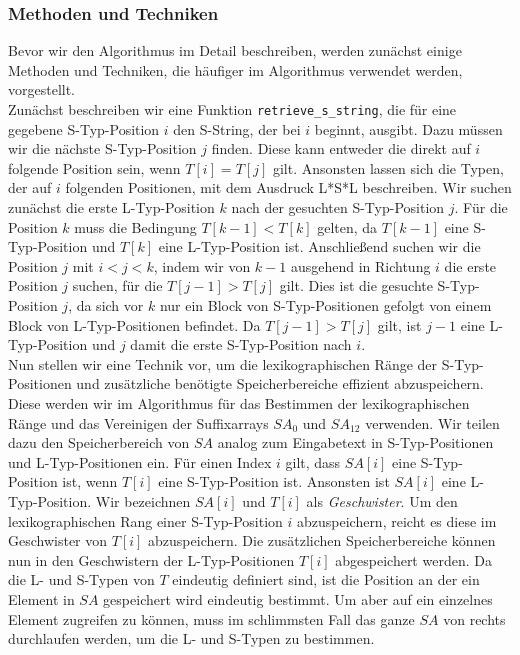 \subsubsection{Methoden und Techniken}
\label{nzSufSort:intro:methods}

Bevor wir den Algorithmus im Detail beschreiben, werden zunächst einige Methoden und Techniken, die häufiger im Algorithmus verwendet werden, vorgestellt. \\
Zunächst beschreiben wir eine Funktion \texttt{retrieve\_s\_string}, die für eine gegebene S-Typ-Position $i$ den S-String, der bei $i$ beginnt, ausgibt. Dazu müssen wir die nächste S-Typ-Position $j$ finden. Diese kann entweder die direkt auf $i$ folgende Position sein, wenn $T[i]=T[j]$ gilt. Ansonsten lassen sich die Typen, der auf $i$ folgenden Positionen, mit dem Ausdruck L*S*L beschreiben. Wir suchen zunächst die erste L-Typ-Position $k$ nach der gesuchten S-Typ-Position $j$. Für die Position $k$ muss die Bedingung $T[k-1] < T[k]$ gelten, da $T[k-1]$ eine S-Typ-Position und $T[k]$ eine L-Typ-Position ist. Anschließend suchen wir die Position $j$ mit $i < j < k$, indem wir von $k-1$ ausgehend in Richtung $i$ die erste Position $j$ suchen, für die $T[j-1] > T[j]$ gilt. Dies ist die gesuchte S-Typ-Position $j$, da sich vor $k$ nur ein Block von S-Typ-Positionen gefolgt von einem Block von L-Typ-Positionen befindet. Da $T[j-1] > T[j]$ gilt, ist $j-1$ eine L-Typ-Position und $j$ damit die erste S-Typ-Position nach $i$. \\
Nun stellen wir eine Technik vor, um die lexikographischen Ränge der S-Typ-Positionen und zusätzliche benötigte Speicherbereiche effizient abzuspeichern. Diese werden wir im Algorithmus für das Bestimmen der lexikographischen Ränge und das Vereinigen der Suffixarrays $SA_0$ und $SA_{12}$ verwenden. Wir teilen dazu den Speicherbereich von $SA$ analog zum Eingabetext in S-Typ-Positionen und L-Typ-Positionen ein. Für einen Index $i$ gilt, dass $SA[i]$ eine S-Typ-Position ist, wenn $T[i]$ eine S-Typ-Position ist. Ansonsten ist $SA[i]$ eine L-Typ-Position. Wir bezeichnen $SA[i]$ und $T[i]$ als \textit{Geschwister}. Um den lexikographischen Rang einer S-Typ-Position $i$ abzuspeichern, reicht es diese im Geschwister von $T[i]$ abzuspeichern. Die zusätzlichen Speicherbereiche können nun in den Geschwistern der L-Typ-Positionen $T[i]$ abgespeichert werden. Da die L- und S-Typen von $T$ eindeutig definiert sind, ist die Position an der ein Element in $SA$ gespeichert wird eindeutig bestimmt. Um aber auf ein einzelnes Element zugreifen zu können, muss im schlimmsten Fall das ganze $SA$ von rechts durchlaufen werden, um die L- und S-Typen zu bestimmen.

